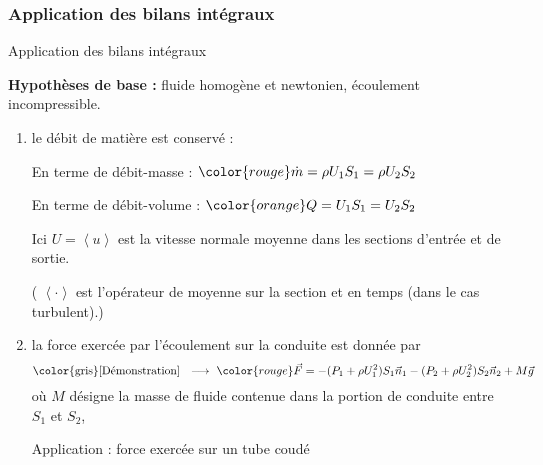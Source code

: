 \subsubsection{Application des bilans intégraux}
\begin{frame}{Application des bilans intégraux}


\small


\textbf{Hypothèses de base :} fluide homogène et newtonien, écoulement incompressible.

\smallskip


\begin{enumerate}
\pause
\item
	le \textcolor{vert}{débit de matière} est conservé :

	En terme de débit-masse : $\color{rouge} \dot m = \rho U_1 S_1 = \rho U_2 S_2$
	
	En terme de débit-volume : $\color{orange} Q = U_1 S_1 =  U_2 S_2$

Ici $U = \left< u \right>$ est la vitesse normale moyenne dans les sections d'entrée et de sortie.

( $\left< \cdot \right>$  est l'opérateur de moyenne
 sur la section et en temps (dans le cas turbulent).)



\pause
\item
	la \textcolor{vert}{force exercée par l'écoulement sur la conduite} est donnée par
	\[
		\mbox{\color{gris} [Démonstration] \; $\longrightarrow$ \;}
		\color{rouge}
		\myvec{F} = -(P_1+\rho U_1^2) S_1\myvec{n}_1 -(P_2+\rho U_2^2) S_2\myvec{n}_2 + M\myvec{g}
	\]
	où $M$ désigne la masse de fluide contenue dans la portion de conduite entre $S_1$ et $S_2$,

\textcolor{gris}{Application : force exercée sur un tube coudé }%


\pause




\end{enumerate}
\end{frame}

